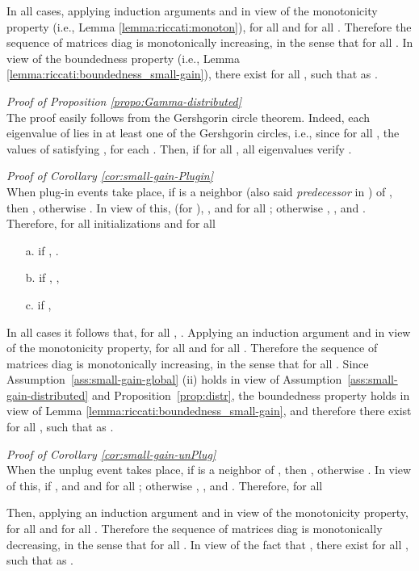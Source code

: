 \documentclass[journal,10pt,draftcls,onecolumn]{IEEEtran}
\begin{document}
\medskip
In all cases, applying induction arguments and in view of the monotonicity property (i.e., Lemma \ref{lemma:riccati:monoton}),  for all  and for all . Therefore the sequence of matrices diag is monotonically increasing, in the sense that  for all . In view of the boundedness property  (i.e., Lemma \ref{lemma:riccati:boundedness_small-gain}), there exist  for all , such that  as .\hfill{}

\medskip
\emph{Proof of Proposition \ref{propo:Gamma-distributed}}\\
The proof easily follows from the Gershgorin circle theorem. Indeed, each eigenvalue of  lies in at least one of the  Gershgorin circles, i.e., since  for all , the values of  satisfying , for each . Then, if  for all , all eigenvalues verify .\hfill


\medskip
\emph{Proof of Corollary \ref{cor:small-gain-Plugin}}\\
When plug-in events take place, if  is a neighbor (also said \emph{predecessor} in \cite{RiversoFarinaGFT_PnP13}) of , then , otherwise . In view of this,  (for ), , and  for all ; otherwise , , and . Therefore, for all initializations and for all 

\begin{itemize}
\item[a.] if , .
\item[b.] if ,
     ,
\item[c.] if ,
     
\end{itemize}
In all cases it follows that, for all , . Applying an induction argument and in view of the monotonicity property,  for all  and for all . Therefore the sequence of matrices diag is monotonically increasing, in the sense that  for all . Since Assumption~\ref{ass:small-gain-global} (ii) holds in view of Assumption~\ref{ass:small-gain-distributed} and Proposition~\ref{prop:distr}, the boundedness property holds in view of Lemma \ref{lemma:riccati:boundedness_small-gain}, and therefore there exist  for all , such that  as .\hfill


\medskip
\emph{Proof of Corollary \ref{cor:small-gain-unPlug}}\\
When the unplug event takes place, if  is a neighbor of , then , otherwise . In view of this,  if , and  and  for all ; otherwise , , and .
Therefore, for all 

Then, applying an induction argument and in view of the monotonicity property,  for all  and for all . Therefore the sequence of matrices diag is monotonically decreasing, in the sense that  for all . In view of the fact that , there exist  for all , such that  as .\hfill

                  
\end{document}
